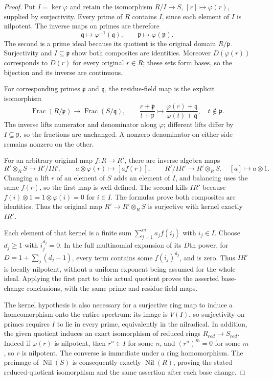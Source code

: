 \begin{proof}
Put $I=\ker\varphi$ and retain the isomorphism
$R/I\to S$, $[r]\mapsto\varphi(r)$, supplied
by surjectivity. Every prime of $R$ contains
$I$, since each element of $I$ is nilpotent.
The inverse maps on primes are therefore
$$
\mathfrak q\longmapsto\varphi^{-1}(\mathfrak q),
\qquad \mathfrak p\longmapsto\varphi(\mathfrak p).
$$
The second is a prime ideal because its
quotient is the original domain $R/\mathfrak p$.
Surjectivity and $I\subseteq\mathfrak p$
show both composites are identities.
Moreover $D(\varphi(r))$ corresponds to
$D(r)$ for every original $r\in R$;
these sets form bases, so the bijection
and its inverse are continuous.

For corresponding primes $\mathfrak p$
and $\mathfrak q$, the residue-field map is
the explicit isomorphism
$$
\operatorname{Frac}(R/\mathfrak p)
\longrightarrow\operatorname{Frac}(S/\mathfrak q),
\qquad
\frac{r+\mathfrak p}{t+\mathfrak p}
\longmapsto
\frac{\varphi(r)+\mathfrak q}{\varphi(t)+\mathfrak q},
\quad t\notin\mathfrak p.
$$
The inverse lifts numerator and denominator
along $\varphi$; different lifts differ by
$I\subseteq\mathfrak p$, so the fractions
are unchanged. A nonzero denominator on
either side remains nonzero on the other.

For an arbitrary original map $f:R\to R'$,
there are inverse algebra maps
$$
R'\otimes_R S\longrightarrow R'/IR',\qquad
a\otimes\varphi(r)\longmapsto[af(r)],
\qquad
R'/IR'\longrightarrow R'\otimes_R S,\quad
[a]\longmapsto a\otimes1.
$$
Changing a lift $r$ of an element of $S$
adds an element of $I$, and balancing
uses the same $f(r)$, so the first map
is well-defined. The second kills $IR'$
because $f(i)\otimes1=1\otimes\varphi(i)=0$
for $i\in I$. The formulas prove both
composites are identities. Thus the
original map $R'\to R'\otimes_R S$ is
surjective with kernel exactly $IR'$.

Each element of that kernel is a finite
sum $\sum_{j=1}^m a_j f(i_j)$ with $i_j\in I$.
Choose $d_j\geq1$ with $i_j^{d_j}=0$.
In the full multinomial expansion of its
$D$th power, for $D=1+\sum_j(d_j-1)$,
every term contains some $f(i_j)^{d_j}$,
and is zero. Thus $IR'$ is locally
nilpotent, without a uniform exponent
being assumed for the whole ideal.
Applying the first part to this actual
quotient proves the asserted base-change
conclusions, with the same prime and
residue-field maps.

The kernel hypothesis is also necessary
for a surjective ring map to induce a
homeomorphism onto the entire spectrum:
its image is $V(I)$, so surjectivity on
primes requires $I$ to lie in every
prime, equivalently in the nilradical.
In addition, the given quotient induces
an exact isomorphism of reduced rings
$R_{red}\to S_{red}$. Indeed if
$\varphi(r)$ is nilpotent, then $r^n\in I$
for some $n$, and $(r^n)^m=0$ for some
$m$, so $r$ is nilpotent. The converse
is immediate under a ring homomorphism.
The preimage of $\operatorname{Nil}(S)$
is consequently exactly
$\operatorname{Nil}(R)$, proving the
stated reduced-quotient isomorphism and
the same assertion after each base change.
\end{proof}


